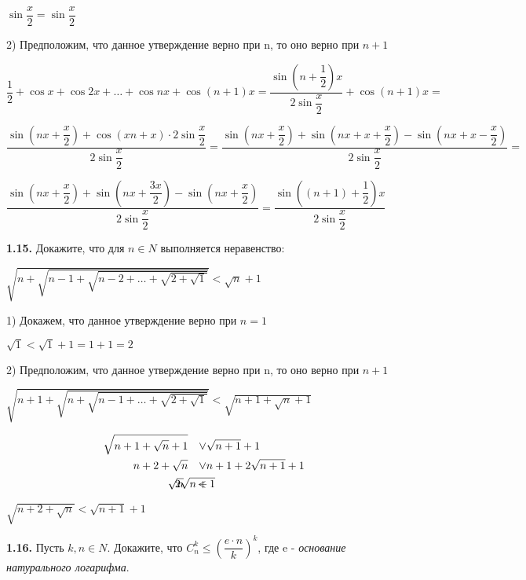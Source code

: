 \documentclass[12pt]{article}
\begin{document}
	\quad$\sin\dfrac{x}{2} = \sin\dfrac{x}{2}$ \medskip
	
	2) Предположим, что данное утверждение верно при n, то оно верно при $n+1$
	\medskip
	
	$
	\dfrac{1}{2}+\cos x+\cos 2x+\dots +\cos nx +\cos (n+1)x = \dfrac{\sin\left(n+\dfrac{1}{2}\right)x}{2\sin\dfrac{x}{2}} + \cos(n+1)x  =
	$
	
	$
	\dfrac{\sin\left(nx+\dfrac{x}{2}\right) + \cos(xn+x)\cdot2\sin\dfrac{x}{2}}{2\sin\dfrac{x}{2}} = \dfrac{\sin(nx+\dfrac{x}{2}) + \sin(nx+x+\dfrac{x}{2})-\sin(nx+x-\dfrac{x}{2})}{2\sin\dfrac{x}{2}} = 
	$
	
	$
	\dfrac{\sin(nx+\dfrac{x}{2})+ \sin(nx+\dfrac{3x}{2})-\sin(nx+\dfrac{x}{2})}{2\sin\dfrac{x}{2}} = \dfrac{\sin\left((n+1)+\dfrac{1}{2}\right)x}{2\sin\dfrac{x}{2}}
	$
	
	\medskip
	
	
	\medskip
	{\bf 1.15.} Докажите, что для $n\in N$ выполняется неравенство:
	
	\begin{center}
		$
		\sqrt{n+\sqrt{n-1+\sqrt{n-2+\dots+\sqrt{2+\sqrt{1}}}}} < \sqrt{n} +1 
		$
	\end{center}
	
	1) Докажем, что данное утверждение верно при $n=1$
	\medskip
	
	\quad$\sqrt{1}<\sqrt{1}+1 = 1+ 1 =2$
	\medskip
	
	2) Предположим, что данное утверждение верно при n, то оно верно при $n+1$
	\medskip
	
	$
	\sqrt{n+1+\sqrt{n+\sqrt{n-1+\dots+\sqrt{2+\sqrt{1}}}}} < \sqrt{n+1+\sqrt{n} +1}
	$
	
	\begin{eqnarray*}
		\sqrt{n+1+\sqrt{n}+1} \quad\vee& \sqrt{n+1}+1 \\
		n+2+\sqrt{n} \quad \vee& n+1 + 2\sqrt{n+1}+1 \\
		\sqrt{n} \quad <& \hspace{-10mm}2\sqrt{n+1}
	\end{eqnarray*}
	
	\qquad$\sqrt{n+2+\sqrt{n}} < \sqrt{n+1}+1$
	
	\medskip
	
	
	\medskip
	{\bf1.16.} \textasteriskcentered\hspace{1mm} Пусть $k,n \in N$. Докажите, что $C_n^k\le \left(\dfrac{e\cdot n}{k}\right)^k$, где e - {\it основание натурального логарифма}.
	
\end{document}
